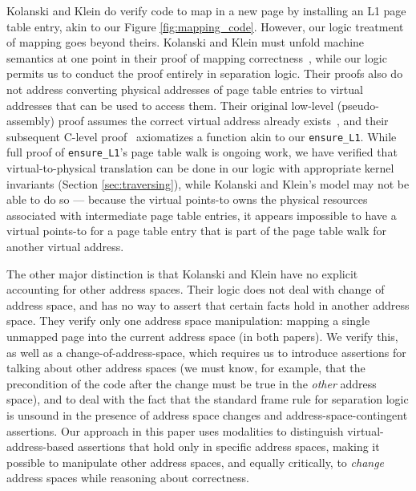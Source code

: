 Kolanski and Klein do verify code to map in a new page by installing an L1 page table entry, akin to our Figure \ref{fig:mapping_code}.
However, our logic treatment of mapping goes beyond theirs. 
Kolanski and Klein must unfold machine semantics at one point in their proof of mapping correctness~\cite[p.~27]{kolanski08vstte}, while
our logic permits us to conduct the proof entirely in separation logic.
Their proofs also do not address
converting physical addresses of page table entries to virtual addresses that can be used to access them.
Their original low-level (pseudo-assembly) proof assumes the correct virtual address already exists~\cite{kolanski08vstte},
and their subsequent C-level proof~\cite{kolanski09tphols} axiomatizes a function akin to our \lstinline|ensure_L1|.
While full proof of \lstinline|ensure_L1|'s page table walk is ongoing work, we have verified that virtual-to-physical
translation can be done in our logic with appropriate kernel invariants (Section \ref{sec:traversing}), while
Kolanski and Klein's model may not be able to do so --- because the virtual points-to owns the physical resources associated with
intermediate page table entries, it appears impossible to have a virtual points-to for a page table entry that is part of the
page table walk for another virtual address.

The other major distinction is that Kolanski and Klein have no explicit accounting for other address spaces.
Their logic does not deal with change of address space, and has no way to assert that certain facts hold
in another address space.
They verify only one address space manipulation: mapping a single unmapped page into the current address space (in both papers).
We verify this, as well as a change-of-address-space, which requires us to introduce assertions for talking
about other address spaces (we must know, for example, that the precondition of the code after the change must be true
in the \emph{other} address space), and to deal with the fact that the standard frame rule
for separation logic is unsound in the presence of address space changes and address-space-contingent assertions.
Our approach in this paper uses modalities to distinguish virtual-address-based assertions that hold only in specific 
address spaces, making it possible to manipulate other address spaces, and equally critically, to \emph{change} address 
spaces while reasoning about correctness. 

